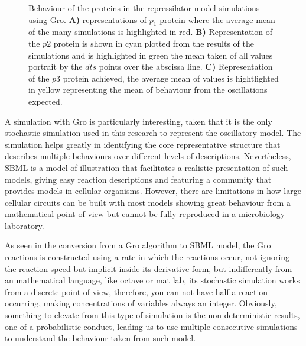 \documentclass[12pt]{article}
\begin{document}
\begin{center}
    \begin{figure}[h]
        
        
        
    
        Behaviour of the proteins in the repressilator model simulations using Gro. \textbf{A)} representations of $p_{1}$ protein where the average mean of the many simulations is highlighted in red. \textbf{B)} Representation of the $p2$ protein is shown in cyan plotted from the results of the simulations and is highlighted in green the mean taken of all values portrait by the $dts$ points over the abscissa line. \textbf{C)} Representation of the $p3$ protein achieved, the average mean of values is hightlighted in yellow representing the mean of behaviour from the oscillations expected.
    \end{figure}
\end{center}

A simulation with Gro is particularly interesting, taken that it is the only stochastic simulation used in this research to represent the oscillatory model. The simulation helps greatly in identifying the core representative structure that describes multiple behaviours over different levels of descriptions. Nevertheless, SBML is a model of illustration that facilitates a realistic presentation of such models, giving easy reaction descriptions and featuring a community that provides models in cellular organisms. However, there are limitations in how large cellular circuits can be built with most models showing great behaviour from a mathematical point of view but cannot be fully reproduced in a microbiology laboratory.

As seen in the conversion from a Gro algorithm to SBML model, the Gro reactions is constructed using a rate in which the reactions occur, not ignoring the reaction speed but implicit inside its derivative form, but indifferently from an mathematical language, like octave or mat lab, its stochastic simulation works from a discrete point of view, therefore, you can not have half a reaction occurring, making concentrations of variables always an integer. Obviously, something to elevate from this type of simulation is the non-deterministic results, one of a probabilistic conduct, leading us to use multiple consecutive simulations to understand the behaviour taken from such model.
\end{document}
